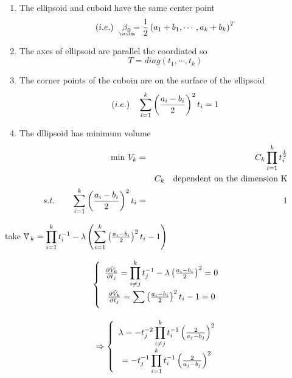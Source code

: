 \documentclass{article}
\begin{document}
\begin{enumerate}
\item The ellipsoid and cuboid have the same center point%
\begin{equation}
(i.e.)\quad \underaccent{\wtilde}{\beta}_{0}=\frac{1}{2}\left(
a_{1}+b_{1},\cdots ,a_{k}+b_{k}\right) ^{T}
\end{equation}

\item The axes of ellipsoid are parallel the coordiated so%
\begin{equation}
T=diag\left( t_{1},\cdots ,t_{k}\right)
\end{equation}

\item The corner points of the cuboin are on the surface of the ellipsoid%
\begin{equation}
(i.e.)\quad \mathop{\displaystyle \sum }\limits_{i=1}^{k}\left( \frac{a_{i}-b_{i}}{2}\right)
^{2}t_{i}=1
\end{equation}

\item The dllipsoid has minimum volume%
\begin{eqnarray}
\min \,V_{k} &=&C_{k}\dprod\limits_{i=1}^{k}t_{i}^{\frac{1}{2}} \\
&&C_{k}\text{ dependent on the dimension K}  \notag \\
s.t.\qquad \dsum\limits_{i=1}^{k}\left( \frac{a_{i}-b_{i}}{2}\right)
^{2}t_{i} &=&1
\end{eqnarray}
\end{enumerate}

\bigskip

take \~{V}$_{k}=\dprod\limits_{i=1}^{k}t_{i}^{-1}-\lambda \left(
\dsum\limits_{i=1}^{k}\left( \frac{a_{i}-b_{i}}{2}\right) ^{2}t_{i}-1\right) 
$

\begin{equation}
\left\{ 
\begin{array}{c}
\frac{\partial \tilde{V}_{k}}{\partial t_{j}}=\dprod\limits_{i\neq
j}^{k}t_{j}^{-1}-\lambda \left( \frac{a_{i}-b_{i}}{2}\right) ^{2}=0 \\ 
\frac{\partial \tilde{V}_{k}}{\partial t_{j}}=\dsum\limits_{{}}^{{}}\left( 
\frac{a_{i}-b_{i}}{2}\right) ^{2}t_{i}-1=0%
\end{array}%
\right.
\end{equation}

\begin{equation}
\Rightarrow \left\{ 
\begin{array}{c}
\lambda =-t_{j}^{-2}\dprod\limits_{i\neq j}^{k}t_{i}^{-1}\left( \frac{2}{%
a_{j}-b_{j}}\right) ^{2} \\ 
=-t_{j}^{-1}\dprod\limits_{i=1}^{k}t_{i}^{-1}\left( \frac{2}{a_{j}-b_{j}}%
\right) ^{2}%
\end{array}%
\right.
\end{equation}
\end{document}
